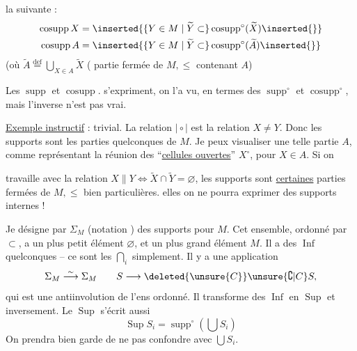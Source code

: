la suivante :
\[
\begin{aligned}
\operatorname{cosupp}X&=\inserted{\{Y\in M\mid\widetilde{Y}\subset}\operatorname{cosupp}^{\circ}(\widetilde{X})\inserted{\}}\\
\operatorname{cosupp}A&=\inserted{\{Y\in M\mid\widetilde{Y}\subset}\operatorname{cosupp}^{\circ}(\widetilde{A})\inserted{\}}
\end{aligned}
\]
(où $\widetilde{A}\overset{\mathrm{def}}{=}\bigcup_{X\in A}\widetilde{X}$ ( partie fermée de $M,\leq$ contenant $A$)



 Les $\operatorname{supp}$ et $\operatorname{cosupp}.$ s'expriment, on l'a vu, en termes des $\operatorname{supp}^{\circ}$ et $\operatorname{cosupp}^{\circ}$, mais l'inverse n'est pas vrai.

\uline{Exemple instructif} :  trivial. La relation $\mid\circ\mid$ est la relation $X\ne Y$. Donc les supports sont les parties quelconques de $M$. Je peux visualiser une telle partie $A$, comme représentant la réunion des ``\uline{cellules ouvertes}'' $X^{\circ}$, pour $X\in A$. Si on

travaille avec la relation $X\mathrel{\|}Y\Longleftrightarrow\widetilde{X}\cap\widetilde{Y}=\varnothing$, les supports sont \uline{certaines} parties fermées de $M,\leq$ bien particulières.  elles on ne pourra exprimer des supports internes !

Je désigne par $\Sigma_M$ (notation )  des supports pour $M$.  Cet ensemble,  ordonné par $\subset$, a un plus petit élément $\varnothing$, et un plus grand élément $M$. Il a des $\operatorname{Inf}$ quelconques -- ce sont les $\bigcap_i$ simplement. Il y a une  application
\[
\Sigma_M\overset{\sim}{\longrightarrow}\Sigma_M\qquad S\longrightarrow\deleted{\unsure{C}}\unsure{\complement|C}S,
\]
qui est une antiinvolution de l'ens ordonné. Il  transforme des $\operatorname{Inf}$ en $\operatorname{Sup}$ et inversement. Le $\operatorname{Sup}$ s'écrit aussi
\[
\operatorname{Sup}S_i=\operatorname{supp}^{\circ}(\textstyle\bigcup S_i)
\]
On prendra bien garde de ne pas  confondre avec $\bigcup S_i$.

